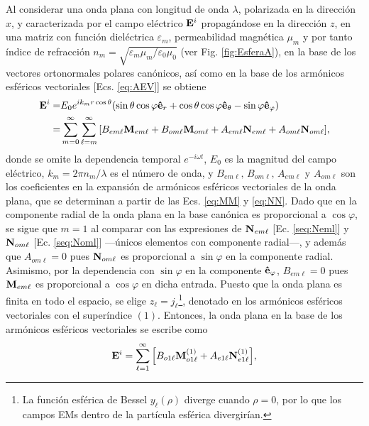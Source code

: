 Al considerar una onda plana con longitud de onda $\lambda$, polarizada en la dirección $x$, y caracterizada por el campo eléctrico $\vb{E}^i$ propagándose en la dirección $z$, en una matriz con función dieléctrica $\varepsilon_m$, permeabilidad magnética $\mu_m$ y por tanto índice de refracción $n_m = \sqrt{\varepsilon_m\mu_m / \varepsilon_0\mu_0}$ (ver Fig. \ref{fig:EsferaA}), en la base de los vectores ortonormales polares canónicos, así como en la base de los armónicos esféricos vectoriales [Ecs. \eqref{eq:AEV}] se obtiene 
	\begin{align*}
\vb{E}^i = & E_0 e^{ik_mr\cos\theta} \qty(\sin\theta\cos\varphi \vu{e}_r + 
								\cos\theta\cos\varphi\vu{e}_\theta-\sin\varphi\vu{e}_\varphi)\notag\\
	 =& \sum_{m=0}^\infty\sum_{\ell=m}^\infty \qty[ B_{em\ell}\vb{M}_{em\ell} 
	 	+ B_{om\ell}\vb{M}_{om\ell} +A_{em\ell}\vb{N}_{em\ell} + A_{om\ell}\vb{N}_{om\ell}],
	\end{align*}
donde se omite la dependencia temporal $e^{-i\omega t}$, $E_0$ es la magnitud del campo eléctrico, $k_m=2\pi n_m/\lambda$ es el número de onda,  y  $B_{em\ell},\, B_{om\ell},\, A_{em\ell}$ y $ A_{om\ell}$ son los coeficientes en la expansión de armónicos esféricos vectoriales de la onda plana, que se determinan a partir de las Ecs. \eqref{eq:MM} y \eqref{eq:NN}. Dado que en la componente radial de la onda plana en la base canónica es proporcional a $\cos\varphi$, se sigue que $m=1$ al comparar con las expresiones de $\vb{N}_{em\ell}$ [Ec. \eqref{seq:Neml}] y $\vb{N}_{om\ell}$ [Ec. \eqref{seq:Noml}] ---únicos elementos con componente radial---, y además que $A_{om\ell}=0$ pues $\vb{N}_{om\ell}$ es proporcional a $\sin\varphi$ en la componente radial. Asimismo, por la dependencia con $\sin\varphi$ en la componente  $\vu{e}_\varphi$, $B_{em\ell}=0$ pues $\vb{M}_{em\ell}$ es proporcional a $\cos\varphi$ en dicha entrada. Puesto que la onda plana es finita en todo el espacio, se elige $z_\ell = j_\ell$\footnote{La función esférica de Bessel $y_\ell(\rho)$ diverge cuando $\rho = 0$, por lo que los campos EMs dentro de la partícula esférica divergirían.}, denotado en los armónicos esféricos vectoriales con el superíndice $(1)$. Entonces, la onda plana en la base de los armónicos esféricos vectoriales se escribe como 
	\begin{align*}
	\vb{E}^i = \sum_{\ell=1}^\infty \qty[B_{o1\ell}\vb{M}_{o1\ell}^{(1)} + A_{e1\ell}\vb{N}_{e1\ell}^{(1)}],
	\end{align*}
